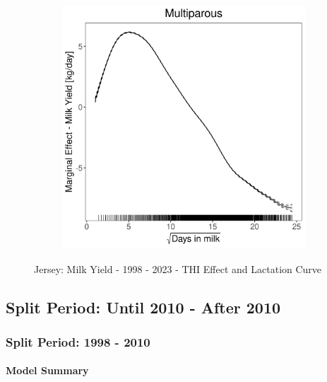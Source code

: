 \begin{figure}[H]
\begin{subfigure}[b]{0.45\textwidth}
    \end{subfigure}
    \hspace{0.05\textwidth} %
    \begin{subfigure}[b]{0.45\textwidth}
        \centering
        \includegraphics[width=\textwidth]{thesis/figures/models/milk/full/je_milk_full/je_milk_full_marginal_dim_milk_multi.png}
    \end{subfigure}
    \caption[]{Jersey: Milk Yield - 1998 - 2023 - THI Effect and Lactation Curve}
    \label{fig:main}
\end{figure}

\subsection{Split Period: Until 2010 - After 2010}
\subsubsection{Split Period: 1998 - 2010}\label{model:je_milk_before}
\paragraph{Model Summary} \quad \\

